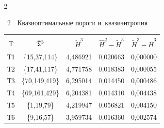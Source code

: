 \begin{multicols}{2}
\begin{figure}[b]
\label{fig3}

\end{figure}





\pagebreak







{\small \begin{center}  %

 \noindent

{{\tablename~2}\ \ \small{Квазиоптимальные пороги и~квазиэнтропия}}

\vspace*{2ex}





\begin{tabular}{|c|c|c|c|c|}

\hline

&&&&\\[-9pt]

 T & ${\tilde{\frak T}}^3$ & $\tilde{H}^3$ & 

$\hat{H}^2-\tilde{H}^3$ & $\tilde{H}^3-\hat{H}^3$ \\

\hline

Т1 & \{15,37,114\} & 4,486921 & 0,020663 & 0,000000 \\


Т2 & \{17,41,117\} & 4,771758 & 0,018383 & 0,000055 \\


Т3 & \{70,149,419\} & 6,295014 & 0,014450 & 0,000486 \\


Т4 & \{69,161,429\} & 6,204381 & 0,014310 & 0,004438 \\


Т5 & \{1,19,79\} & 4,219947 & 0,056821 & 0,004150 \\


Т6 & \{9,16,57\} & 3,959734 & 0,016360 & 0,002574 \\

\hline

\end{tabular}

\end{center}

}
\end{multicols}
